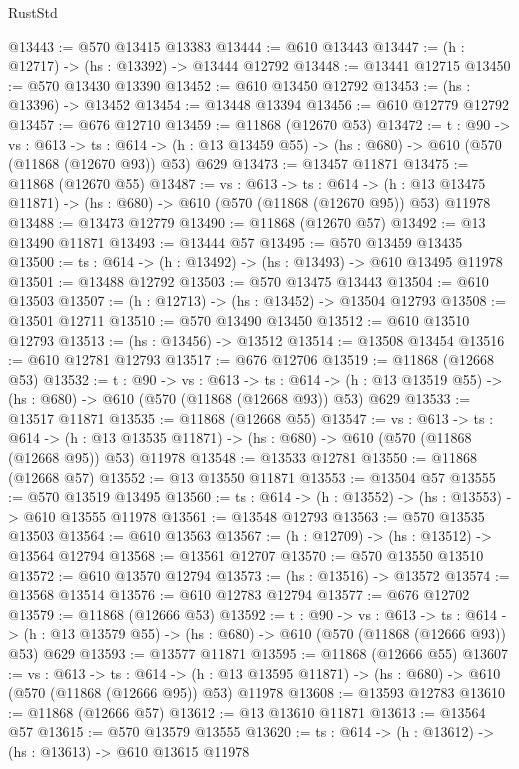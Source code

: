 \begin{lexlean}{RustStd}
\begin{coremodule}
@13443 := @570 @13415 @13383
@13444 := @610 @13443
@13447 := (h : @12717) -> (hs : @13392) -> @13444 @12792
@13448 := @13441 @12715
@13450 := @570 @13430 @13390
@13452 := @610 @13450 @12792
@13453 := (hs : @13396) -> @13452
@13454 := @13448 @13394
@13456 := @610 @12779 @12792
@13457 := @676 @12710
@13459 := @11868 (@12670 @53)
@13472 := {t : @90} ->
  {vs : @613} ->
  {ts : @614} -> (h : @13 @13459 @55) -> (hs : @680) -> @610 (@570 (@11868 (@12670 @93)) @53) @629
@13473 := @13457 @11871
@13475 := @11868 (@12670 @55)
@13487 := {vs : @613} ->
  {ts : @614} ->
  (h : @13 @13475 @11871) -> (hs : @680) -> @610 (@570 (@11868 (@12670 @95)) @53) @11978
@13488 := @13473 @12779
@13490 := @11868 (@12670 @57)
@13492 := @13 @13490 @11871
@13493 := @13444 @57
@13495 := @570 @13459 @13435
@13500 := {ts : @614} -> (h : @13492) -> (hs : @13493) -> @610 @13495 @11978
@13501 := @13488 @12792
@13503 := @570 @13475 @13443
@13504 := @610 @13503
@13507 := (h : @12713) -> (hs : @13452) -> @13504 @12793
@13508 := @13501 @12711
@13510 := @570 @13490 @13450
@13512 := @610 @13510 @12793
@13513 := (hs : @13456) -> @13512
@13514 := @13508 @13454
@13516 := @610 @12781 @12793
@13517 := @676 @12706
@13519 := @11868 (@12668 @53)
@13532 := {t : @90} ->
  {vs : @613} ->
  {ts : @614} -> (h : @13 @13519 @55) -> (hs : @680) -> @610 (@570 (@11868 (@12668 @93)) @53) @629
@13533 := @13517 @11871
@13535 := @11868 (@12668 @55)
@13547 := {vs : @613} ->
  {ts : @614} ->
  (h : @13 @13535 @11871) -> (hs : @680) -> @610 (@570 (@11868 (@12668 @95)) @53) @11978
@13548 := @13533 @12781
@13550 := @11868 (@12668 @57)
@13552 := @13 @13550 @11871
@13553 := @13504 @57
@13555 := @570 @13519 @13495
@13560 := {ts : @614} -> (h : @13552) -> (hs : @13553) -> @610 @13555 @11978
@13561 := @13548 @12793
@13563 := @570 @13535 @13503
@13564 := @610 @13563
@13567 := (h : @12709) -> (hs : @13512) -> @13564 @12794
@13568 := @13561 @12707
@13570 := @570 @13550 @13510
@13572 := @610 @13570 @12794
@13573 := (hs : @13516) -> @13572
@13574 := @13568 @13514
@13576 := @610 @12783 @12794
@13577 := @676 @12702
@13579 := @11868 (@12666 @53)
@13592 := {t : @90} ->
  {vs : @613} ->
  {ts : @614} -> (h : @13 @13579 @55) -> (hs : @680) -> @610 (@570 (@11868 (@12666 @93)) @53) @629
@13593 := @13577 @11871
@13595 := @11868 (@12666 @55)
@13607 := {vs : @613} ->
  {ts : @614} ->
  (h : @13 @13595 @11871) -> (hs : @680) -> @610 (@570 (@11868 (@12666 @95)) @53) @11978
@13608 := @13593 @12783
@13610 := @11868 (@12666 @57)
@13612 := @13 @13610 @11871
@13613 := @13564 @57
@13615 := @570 @13579 @13555
@13620 := {ts : @614} -> (h : @13612) -> (hs : @13613) -> @610 @13615 @11978

\end{coremodule}
\end{lexlean}
